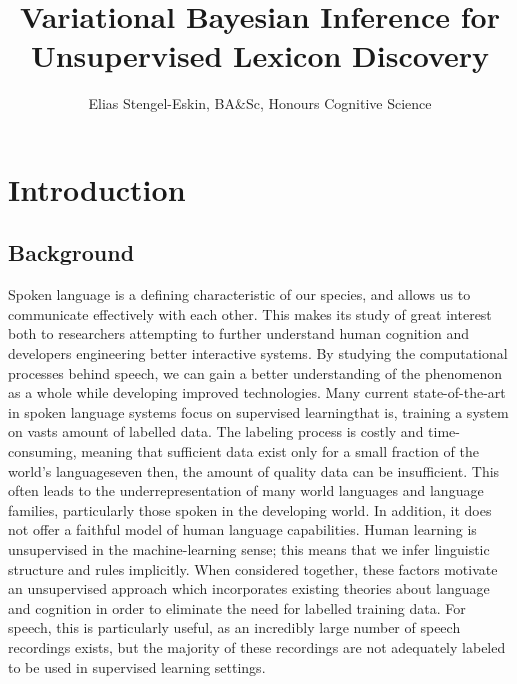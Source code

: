 \documentclass[12pt,letterpaper]{article}
\title{\vspace{-1.5cm} Variational Bayesian Inference for Unsupervised Lexicon Discovery}
\author{Elias Stengel-Eskin, BA\&Sc, Honours Cognitive Science}
\begin{document}
\maketitle
\section{Introduction}
\subsection{Background}
Spoken language is a defining characteristic of our species, and allows us to communicate effectively with each other. This makes its study of great interest both to researchers attempting to further understand human cognition and developers engineering better interactive systems. By studying the computational processes behind speech, we can gain a better understanding of the phenomenon as a whole while developing improved technologies. Many current state-of-the-art in spoken language systems focus on supervised learning\textemdash that is, training a system on vasts amount of labelled data. The labeling process is costly and time-consuming, meaning that sufficient data exist only for a small fraction of the world's languages\textemdash even then, the amount of quality data can be insufficient. This often leads to the underrepresentation of many world languages and language families, particularly those spoken in the developing world. In addition, it does not offer a faithful model of human language capabilities. Human learning is unsupervised in the machine-learning sense; this means that we infer linguistic structure and rules implicitly. When considered together, these factors motivate an unsupervised approach which incorporates existing theories about language and cognition in order to eliminate the need for labelled training data. For speech, this is particularly useful, as an incredibly large number of speech recordings exists, but the majority of these recordings are not adequately labeled to be used in supervised learning settings. 
\end{document}
